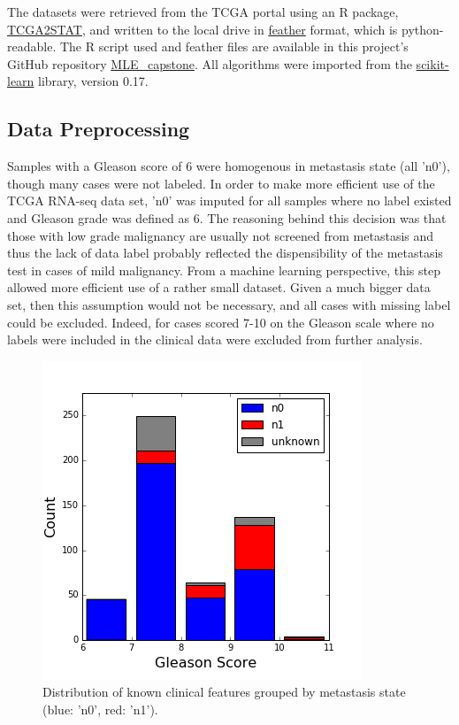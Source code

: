 \documentclass[final]{article}
\begin{document}
The datasets were retrieved from the TCGA portal using an R package,
\href{https://cran.r-project.org/web/packages/TCGA2STAT/index.html}{TCGA2STAT},
and written to the local drive in \href{https://github.com/wesm/feather}{feather} format,
which is python-readable.  The R script used and feather files are
available in this project's GitHub repository
\href{https://github.com/CCThompson82/MLE\_capstone}{MLE\_capstone}.  All
algorithms were imported from the
\href{http://scikit-learn.org/stable/}{scikit-learn} library, version 0.17.

\subsection{Data Preprocessing}

Samples with a Gleason score of 6 were homogenous in metastasis state (all
'n0'), though many cases were not labeled.  In order to make more efficient use
of the  TCGA RNA-seq data set, 'n0' was imputed for all samples where no label
existed and  Gleason grade was defined as 6.  The reasoning behind this decision
was that those with low grade  malignancy are usually not screened from
metastasis and thus the lack of data label  probably reflected the
dispensibility of the metastasis test in cases of mild malignancy. From a
machine learning perspective, this step allowed more efficient use of a rather
small dataset.  Given a much bigger data set, then this assumption would not be
necessary, and  all cases with missing label could be excluded.  Indeed, for
cases scored 7-10 on the Gleason scale where no labels were included in the
clinical data were excluded from further analysis.

\begin{figure}
  \centering
  \includegraphics[scale=0.5]{GleasonHist2}
  \caption{Distribution of known clinical features grouped by metastasis state (blue: 'n0', red: 'n1').\label{fig:postGSHist}}
\end{figure}
\end{document}
